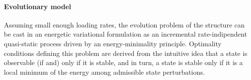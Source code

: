 







\paragraph{Evolutionary model}
\label{sec:stability}

Assuming small enough loading rates, 
the evolution problem of the structure can be cast in an energetic variational formulation as an incremental rate-indipendent quasi-static process driven by an energy-minimality principle.
Optimality conditions defining this problem are derived from the
intuitive idea that a state is observable (if and) only if it is stable, and in turn, a state is stable only if it is a local minimum of the energy among admissible state perturbations. 

